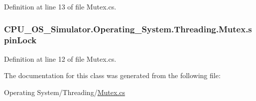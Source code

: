 Definition at line 13 of file Mutex.\+cs.

\hypertarget{class_c_p_u___o_s___simulator_1_1_operating___system_1_1_threading_1_1_mutex_ac6a3c332cf52ba404c62451757a138f4}{}
\subsubsection[{spin\+Lock}]{ C\+P\+U\+\_\+\+O\+S\+\_\+\+Simulator.\+Operating\+\_\+\+System.\+Threading.\+Mutex.\+spin\+Lock\hspace{0.3cm}{\ttfamily [private]}}\label{class_c_p_u___o_s___simulator_1_1_operating___system_1_1_threading_1_1_mutex_ac6a3c332cf52ba404c62451757a138f4}


Definition at line 12 of file Mutex.\+cs.



The documentation for this class was generated from the following file\+:\begin{DoxyCompactItemize}
\item 
Operating System/\+Threading/\hyperlink{_mutex_8cs}{Mutex.\+cs}\end{DoxyCompactItemize}

